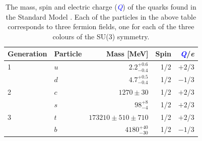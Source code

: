 \begin{table}[h!]
\centering
\begin{tabular}{l l r r r}
\hline
Generation & Particle & Mass [MeV] & Spin & \textcolor{blue}{\textit{Q}}/\textit{e} \\
\hline
1 & $u$ & $2.2^{+0.6}_{-0.4}$ & 1/2 & $+2$/3 \\
 & $d$ & $4.7^{+0.5}_{-0.4}$ & 1/2 & $-1$/3 \\
\hline
2 & $c$ & $1270\pm30$ & 1/2 & $+2$/3 \\
 & $s$ & $98^{+8}_{-4}$ & 1/2 & $+2$/3 \\
\hline
3 & $t$ & $173210 \pm 510 \pm 710$ & 1/2 & $+2$/3 \\
 & $b$ & $4180^{+40}_{-30}$ & 1/2 & $-1$/3 \\
\end{tabular}
\caption[The mass, spin and electric charge (\textcolor{blue}{\textit{Q}}) of the quarks found in the Standard Model \cite{Beringer:1900zz}.  Each of the particles in the above table corresponds to three fermion fields, one for each of the three colours of the SU(3) symmetry.]{The mass, spin and electric charge (\textcolor{blue}{\textit{Q}}) of the quarks found in the Standard Model \cite{Beringer:1900zz}.  Each of the particles in the above table corresponds to three fermion fields, one for each of the three colours of the SU(3) symmetry.} 
\label{table:smquarks}
\end{table}

